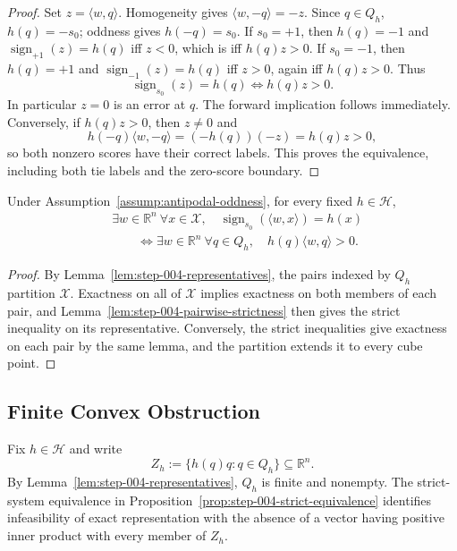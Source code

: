 \begin{proof}
Set $z=\langle w,q\rangle$.  Homogeneity gives
$\langle w,-q\rangle=-z$.  Since $q\in Q_h$, $h(q)=-s_0$; oddness gives
$h(-q)=s_0$.  If $s_0=+1$, then $h(q)=-1$ and
$\operatorname{sign}_{+1}(z)=h(q)$ iff $z<0$, which is iff
$h(q)z>0$.  If $s_0=-1$, then $h(q)=+1$ and
$\operatorname{sign}_{-1}(z)=h(q)$ iff $z>0$, again iff $h(q)z>0$.  Thus
\[
\operatorname{sign}_{s_0}(z)=h(q)
\Longleftrightarrow h(q)z>0.
\]
In particular $z=0$ is an error at $q$.  The forward implication follows
immediately.  Conversely, if $h(q)z>0$, then $z\neq0$ and
\[
 h(-q)\langle w,-q\rangle=(-h(q))(-z)=h(q)z>0,
\]
so both nonzero scores have their correct labels.  This proves the
equivalence, including both tie labels and the zero-score boundary.
\end{proof}

\begin{proposition}
\label{prop:step-004-strict-equivalence}
Under Assumption~\ref{assump:antipodal-oddness}, for every fixed
$h\in\mathcal H$,
\[
\begin{aligned}
&\exists w\in\mathbb R^n\ \forall x\in\mathcal X,
\quad\operatorname{sign}_{s_0}(\langle w,x\rangle)=h(x)\\
&\qquad\Longleftrightarrow
\exists w\in\mathbb R^n\ \forall q\in Q_h,
\quad h(q)\langle w,q\rangle>0.
\end{aligned}
\]
\end{proposition}

\begin{proof}
By Lemma~\ref{lem:step-004-representatives}, the pairs indexed by $Q_h$
partition $\mathcal X$.  Exactness on all of $\mathcal X$ implies exactness
on both members of each pair, and Lemma~\ref{lem:step-004-pairwise-strictness}
then gives the strict inequality on its representative.  Conversely, the
strict inequalities give exactness on each pair by the same lemma, and the
partition extends it to every cube point.
\end{proof}

\subsection{Finite Convex Obstruction}
\label{app:convex-obstruction}

Fix $h\in\mathcal H$ and write
\[
 Z_h:=\{h(q)q:q\in Q_h\}\subseteq\mathbb R^n.
\]
By Lemma~\ref{lem:step-004-representatives}, $Q_h$ is finite and nonempty.
The strict-system equivalence in Proposition~\ref{prop:step-004-strict-equivalence}
identifies infeasibility of exact representation with the absence of a vector
having positive inner product with every member of $Z_h$.

